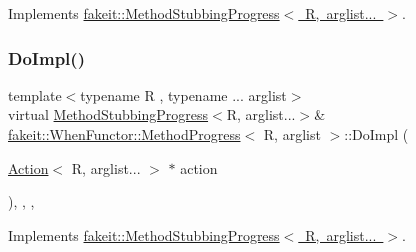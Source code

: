 Implements \mbox{\hyperlink{structfakeit_1_1MethodStubbingProgress_a73218fd396f0096f93462f2d4656c509}{fakeit\+::\+Method\+Stubbing\+Progress$<$ R, arglist... $>$}}.

\mbox{\label{structfakeit_1_1WhenFunctor_1_1MethodProgress_a4b8a947b1514fe715743ee8e65953d9d}} 
\subsubsection{\texorpdfstring{DoImpl()}{DoImpl()}\hspace{0.1cm}{\footnotesize\ttfamily [7/9]}}
{\footnotesize\ttfamily template$<$typename R , typename ... arglist$>$ \\
virtual \mbox{\hyperlink{structfakeit_1_1MethodStubbingProgress}{Method\+Stubbing\+Progress}}$<$R, arglist...$>$\& \mbox{\hyperlink{structfakeit_1_1WhenFunctor_1_1MethodProgress}{fakeit\+::\+When\+Functor\+::\+Method\+Progress}}$<$ R, arglist $>$\+::Do\+Impl (\begin{DoxyParamCaption}\item[{\mbox{\hyperlink{structfakeit_1_1Action}{Action}}$<$ R, arglist... $>$ $\ast$}]{action }\end{DoxyParamCaption})\hspace{0.3cm}{\ttfamily [inline]}, {\ttfamily [override]}, {\ttfamily [protected]}, {\ttfamily [virtual]}}



Implements \mbox{\hyperlink{structfakeit_1_1MethodStubbingProgress_a73218fd396f0096f93462f2d4656c509}{fakeit\+::\+Method\+Stubbing\+Progress$<$ R, arglist... $>$}}.

\mbox{\label{structfakeit_1_1WhenFunctor_1_1MethodProgress_a4b8a947b1514fe715743ee8e65953d9d}} 
